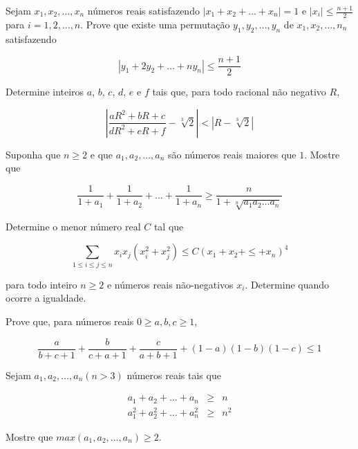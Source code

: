 \begin{questao}
  Sejam $x_1,x_2,\ldots,x_n$ números reais satisfazendo $|x_1+x_2+\ldots+x_n| =
  1$ e $\displaystyle |x_i| \leq \frac{n+1}{2}$ para $i=1,2,\ldots,n$. Prove que
  existe uma permutação $y_1,y_2,\ldots,y_n$ de $x_1,x_2,\ldots,n_n$
  satisfazendo

  $$|y_1+2y_2+\ldots+ny_n| \leq \frac{n+1}{2}$$
\end{questao}

\begin{questao}
  Determine inteiros $a$, $b$, $c$, $d$, $e$ e $f$ tais que, para todo racional
  não negativo $R$,

  $$ \left| \frac{aR^2+bR+c}{dR^2+eR+f} - \sqrt[3]{2} \right| < \left| {R -
    \sqrt[3]{2}} \right| $$
\end{questao}

\begin{questao}
  Suponha que $n \geq 2$ e que $a_1,a_2,\ldots,a_n$ são números reais maiores
  que $1$. Mostre que

  $$ \frac{1}{1+a_1} + \frac{1}{1+a_2} + \ldots + \frac{1}{1+a_n} \geq
  \frac{n}{1+\sqrt[n]{a_1a_2\ldots a_n}} $$
\end{questao}

\begin{questao}
  Determine o menor número real $C$ tal que

  $$ \sum_{1 \leq i \leq j \leq n}{x_ix_j(x_i^2+x_j^2)} \leq
  C(x_1+x_2+\leq+x_n)^4 $$

  para todo inteiro $n \geq 2$ e números reais não-negativos $x_i$. Determine
  quando ocorre a igualdade.
\end{questao}

\begin{questao}
  Prove que, para números reais $0 \geq a,b,c \geq 1$,

  $$ \frac{a}{b+c+1} + \frac{b}{c+a+1} + \frac{c}{a+b+1} + (1-a)(1-b)(1-c) \leq
  1 $$
\end{questao}

\begin{questao}
  Sejam $a_1, a_2, \ldots, a_n (n>3)$ números reais tais que

  \begin{eqnarray*}
    a_1+a_2+ \ldots + a_n & \geq & n \\ a_1^2+a_2^2+ \ldots + a_n^2 & \geq & n^2
  \end{eqnarray*}

  Mostre que $max(a_1,a_2,\ldots,a_n) \geq 2$.
\end{questao}

